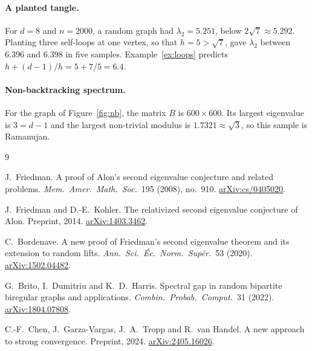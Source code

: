 \documentclass[11pt,letterpaper]{article}
\theoremstyle{definition}
\theoremstyle{remark}
\begin{document}
\paragraph{A planted tangle.}
For $d=8$ and $n=2000$, a random graph had $\lambda_2=5.251$, below $2\sqrt7\approx5.292$.
Planting three self-loops at one vertex, so that $h=5>\sqrt7$, gave $\lambda_2$ between $6.396$
and $6.398$ in five samples. Example~\ref{ex:loops} predicts $h+(d-1)/h=5+7/5=6.4$.

\paragraph{Non-backtracking spectrum.}
For the graph of Figure~\ref{fig:nb}, the matrix $B$ is $600\times600$. Its largest eigenvalue is
$3=d-1$ and the largest non-trivial modulus is $1.7321\approx\sqrt3$, so this sample is
Ramanujan.

\begin{thebibliography}{9}

J.~Friedman.
\newblock A proof of Alon's second eigenvalue conjecture and related problems.
\newblock \emph{Mem.\ Amer.\ Math.\ Soc.}\ 195 (2008), no.~910.
\newblock \href{https://arxiv.org/abs/cs/0405020}{arXiv:cs/0405020}.

J.~Friedman and D.-E.~Kohler.
\newblock The relativized second eigenvalue conjecture of Alon.
\newblock Preprint, 2014. \href{https://arxiv.org/abs/1403.3462}{arXiv:1403.3462}.

C.~Bordenave.
\newblock A new proof of Friedman's second eigenvalue theorem and its extension to random lifts.
\newblock \emph{Ann.\ Sci.\ \'Ec.\ Norm.\ Sup\'er.}\ 53 (2020).
\newblock \href{https://arxiv.org/abs/1502.04482}{arXiv:1502.04482}.

G.~Brito, I.~Dumitriu and K.~D.~Harris.
\newblock Spectral gap in random bipartite biregular graphs and applications.
\newblock \emph{Combin.\ Probab.\ Comput.}\ 31 (2022).
\newblock \href{https://arxiv.org/abs/1804.07808}{arXiv:1804.07808}.

C.-F.~Chen, J.~Garza-Vargas, J.~A.~Tropp and R.~van Handel.
\newblock A new approach to strong convergence.
\newblock Preprint, 2024. \href{https://arxiv.org/abs/2405.16026}{arXiv:2405.16026}.

\end{thebibliography}
\end{document}
